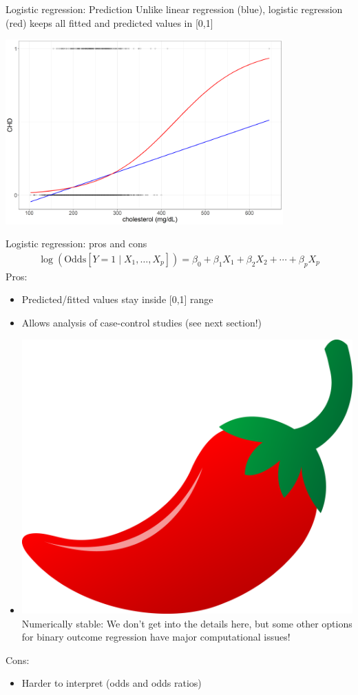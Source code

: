 \documentclass[10pt,t]{beamer}
\begin{document}
\begin{frame}{Logistic regression: Prediction}
	Unlike linear regression (blue), logistic regression (red) keeps all fitted and predicted values in [0,1]
		\begin{center}
		\includegraphics[width=0.8\textwidth]{./figs/scatter_glm}
	\end{center}
\end{frame}

\begin{frame}{Logistic regression: pros and cons}
	\begin{align*}
		\log(\text{Odds}[Y = 1 \mid X_1,\dots, X_p]) = \beta_0 + \beta_1X_1 + \beta_2X_2 + \cdots + \beta_pX_p
	\end{align*}
	Pros:
	\begin{itemize}
		\item Predicted/fitted values stay inside [0,1] range
		\item Allows analysis of case-control studies (see next section!)
		\item \includegraphics[scale=0.01]{./figs/chilipepper} Numerically stable: We don't get into the details here, but some other options for binary outcome regression have major computational issues!
	\end{itemize}
	Cons:
	\begin{itemize}
		\item Harder to interpret (odds and odds ratios)
	\end{itemize}
\end{frame}
\end{document}
